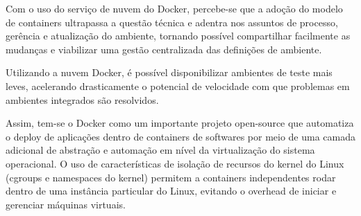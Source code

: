     Com o uso do serviço de nuvem do Docker, percebe-se que a
    adoção do modelo de containers ultrapassa a questão técnica
    e adentra nos assuntos de processo, gerência e atualização
    do ambiente, tornando possível compartilhar facilmente as
    mudanças e viabilizar uma gestão centralizada das definições
    de ambiente.

    Utilizando a nuvem Docker, é possível disponibilizar ambientes de
    teste mais leves, acelerando drasticamente o potencial de velocidade
    com que problemas em ambientes integrados são resolvidos.

    Assim, tem-se o Docker como um importante projeto open-source
    que automatiza o deploy de aplicações dentro de containers de
    softwares por meio de uma camada adicional de abstração e automação
    em nível da virtualização do sistema operacional. O uso de
    características de isolação de recursos do kernel do Linux
    (cgroups e namespaces do kernel) permitem a containers
    independentes rodar dentro de uma instância particular do Linux,
    evitando o overhead de iniciar e gerenciar máquinas virtuais.

